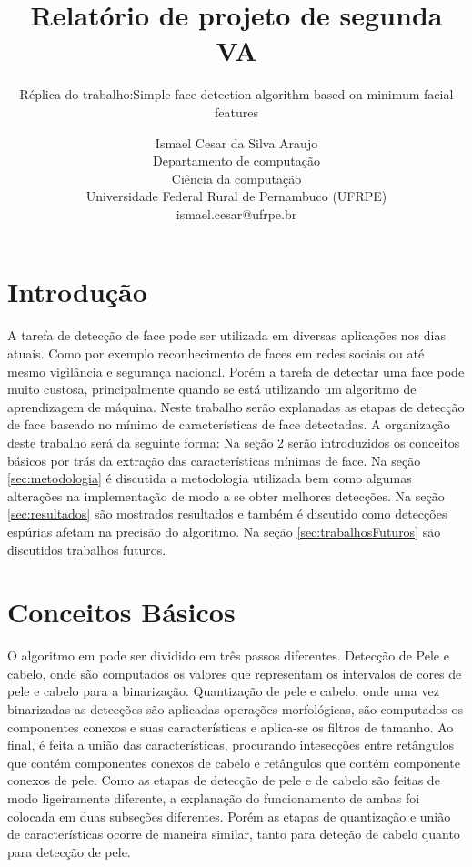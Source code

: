 \documentclass[journal,onecolumn]{IEEEtran}
\title{Relatório de projeto de segunda VA}
\subtitle{Réplica do trabalho:Simple face-detection algorithm based on minimum facial features}
\author{		Ismael Cesar da Silva Araujo \\
  				Departamento de computação \\
				  Ciência da computação\\
		Universidade Federal Rural de Pernambuco (UFRPE)\\
			ismael.cesar@ufrpe.br}
\date{}
\begin{document}
\maketitle

\section{Introdução}
	A tarefa de detecção de face pode ser utilizada em diversas aplicações nos dias atuais.
	Como por exemplo reconhecimento de faces em redes sociais ou até mesmo vigilância e segurança nacional.
	Porém a tarefa de detectar uma face pode muito custosa, principalmente quando se está utilizando um algoritmo de aprendizagem de máquina.
	Neste trabalho serão explanadas as etapas de detecção de face baseado no mínimo de características de face detectadas. 
	A organização deste trabalho será da seguinte forma: Na seção \ref{sec:conceitosBasicos} serão introduzidos os conceitos básicos por trás da extração das características mínimas de face.
	Na seção \ref{sec:metodologia} é discutida a metodologia utilizada bem como algumas alterações na implementação de modo a se obter melhores detecções.
	Na seção \ref{sec:resultados} são mostrados resultados e também é discutido como detecções espúrias afetam na precisão do algoritmo.
	Na seção \ref{sec:trabalhosFuturos} são discutidos trabalhos futuros.	
\section{Conceitos Básicos}
	\label{sec:conceitosBasicos}
	O algoritmo em \cite{chen2007simple} pode ser dividido em três passos diferentes. 
	Detecção de Pele e cabelo, onde são computados os valores que representam os intervalos de cores de pele e cabelo para a binarização. 
	Quantização de pele e cabelo, onde uma vez binarizadas as detecções são aplicadas operações morfológicas, são computados os componentes conexos e suas características e aplica-se os filtros de tamanho.
	Ao final, é feita a união das características, procurando intesecções entre retângulos que contém componentes conexos de cabelo e retângulos que contém componente conexos de pele.
	Como as etapas de detecção de pele e de cabelo são feitas de modo ligeiramente diferente, a explanação do funcionamento de ambas foi colocada em duas subseções diferentes.
	Porém as etapas de quantização e união de características ocorre de maneira similar, tanto para deteção de cabelo quanto para detecção de pele.
	
\end{document}
